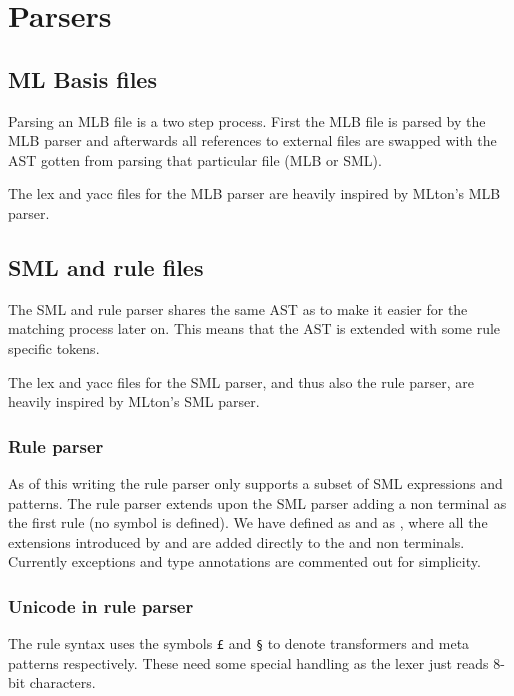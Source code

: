 
\section{Parsers}

\subsection{ML Basis files}

Parsing an MLB file is a two step process. First the MLB file is parsed by the
MLB parser and afterwards all references to external files are swapped with the
AST gotten from parsing that particular file (MLB or SML).

The lex and yacc files for the MLB parser are heavily inspired by MLton's MLB
parser.

\subsection{SML and rule files}

The SML and rule parser shares the same AST as to make it easier for the
matching process later on. This means that the AST is extended with some rule
specific tokens.

The lex and yacc files for the SML parser, and thus also the rule parser, are
heavily inspired by MLton's SML parser.

\subsubsection{Rule parser}

As of this writing the rule parser only supports a subset of SML expressions and
patterns. The rule parser extends upon the SML parser adding a 
non terminal as the first rule (no  symbol is defined). We have
defined  as  and  as , where all the
extensions introduced by  and  are added directly to the
 and  non terminals. Currently exceptions and type annotations
are commented out for simplicity.

\subsubsection{Unicode in rule parser}

The rule syntax uses the symbols \texttt{£} and \texttt{§} to denote
transformers and meta patterns respectively. These need some special handling as
the lexer\cite{ml-lex-yacc} just reads 8-bit characters.


